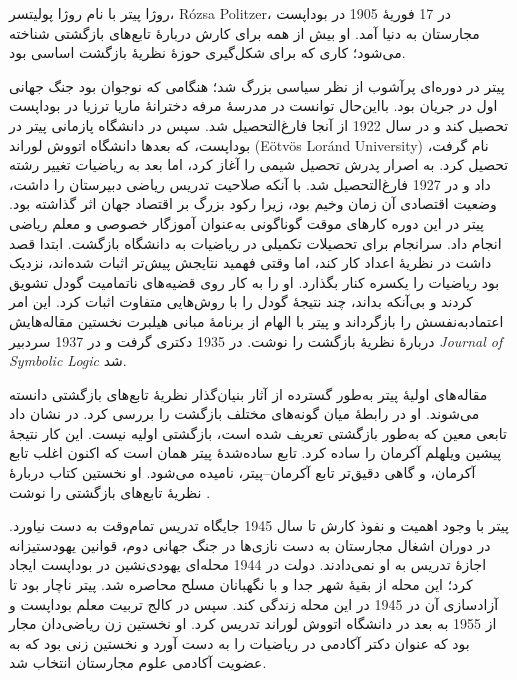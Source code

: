 \documentclass[../../../include/open-logic-section]{subfiles}
\begin{document}



روژا پیتر با نام روژا پولیتسر، R\'ozsa Politzer، در 17 فوریهٔ 1905 در
بوداپست مجارستان به دنیا آمد. او بیش از همه برای کارش دربارهٔ تابع‌های
بازگشتی شناخته می‌شود؛ کاری که برای شکل‌گیری حوزهٔ نظریهٔ بازگشت اساسی
بود.

پیتر در دوره‌ای پرآشوب از نظر سیاسی بزرگ شد؛ هنگامی که نوجوان بود جنگ
جهانی اول در جریان بود. بااین‌حال توانست در مدرسهٔ مرفه دخترانهٔ ماریا
ترزیا در بوداپست تحصیل کند و در سال 1922 از آنجا فارغ‌التحصیل شد. سپس
در دانشگاه پازمانی پیتر در بوداپست، که بعدها دانشگاه اتووش لوراند
(E\"otv\"os Lor\'and University) نام گرفت، تحصیل کرد. به اصرار پدرش
تحصیل شیمی را آغاز کرد، اما بعد به ریاضیات تغییر رشته داد و در 1927
فارغ‌التحصیل شد. با آنکه صلاحیت تدریس ریاضی دبیرستان را داشت، وضعیت
اقتصادی آن زمان وخیم بود، زیرا رکود بزرگ بر اقتصاد جهان اثر گذاشته
بود. پیتر در این دوره کارهای موقت گوناگونی به‌عنوان آموزگار خصوصی و
معلم ریاضی انجام داد. سرانجام برای تحصیلات تکمیلی در ریاضیات به
دانشگاه بازگشت. ابتدا قصد داشت در نظریهٔ اعداد کار کند، اما وقتی فهمید
نتایجش پیش‌تر اثبات شده‌اند، نزدیک بود ریاضیات را یکسره کنار بگذارد.
او را به کار روی قضیه‌های ناتمامیت گودل تشویق کردند و بی‌آنکه بداند،
چند نتیجهٔ گودل را با روش‌هایی متفاوت اثبات کرد. این امر اعتمادبه‌نفسش
را بازگرداند و پیتر با الهام از برنامهٔ مبانی هیلبرت نخستین مقاله‌هایش
دربارهٔ نظریهٔ بازگشت را نوشت. در 1935 دکتری گرفت و در 1937 سردبیر
\emph{Journal of Symbolic Logic} شد.

مقاله‌های اولیهٔ پیتر به‌طور گسترده از آثار بنیان‌گذار نظریهٔ تابع‌های
بازگشتی دانسته می‌شوند. او در \cite{Peter1935a} رابطهٔ میان گونه‌های
مختلف بازگشت را بررسی کرد. در \cite{Peter1935b} نشان داد تابعی معین که
به‌طور بازگشتی تعریف شده است، بازگشتی اولیه نیست. این کار نتیجهٔ
پیشین ویلهلم آکرمان را ساده کرد. تابع ساده‌شدهٔ پیتر همان است که اکنون
اغلب تابع آکرمان، و گاهی دقیق‌تر تابع آکرمان--پیتر، نامیده می‌شود. او
نخستین کتاب دربارهٔ نظریهٔ تابع‌های بازگشتی را نوشت \citep{Peter1951}.

پیتر با وجود اهمیت و نفوذ کارش تا سال 1945 جایگاه تدریس تمام‌وقت به
دست نیاورد. در دوران اشغال مجارستان به دست نازی‌ها در جنگ جهانی دوم،
قوانین یهودستیزانه اجازهٔ تدریس به او نمی‌دادند. دولت در 1944 محله‌ای
یهودی‌نشین در بوداپست ایجاد کرد؛ این محله از بقیهٔ شهر جدا و با
نگهبانان مسلح محاصره شد. پیتر ناچار بود تا آزادسازی آن در 1945 در این
محله زندگی کند. سپس در کالج تربیت معلم بوداپست و از 1955 به بعد در
دانشگاه اتووش لوراند تدریس کرد. او نخستین زن ریاضی‌دان مجار بود که
عنوان دکتر آکادمی در ریاضیات را به دست آورد و نخستین زنی بود که به
عضویت آکادمی علوم مجارستان انتخاب شد.
\end{document}
